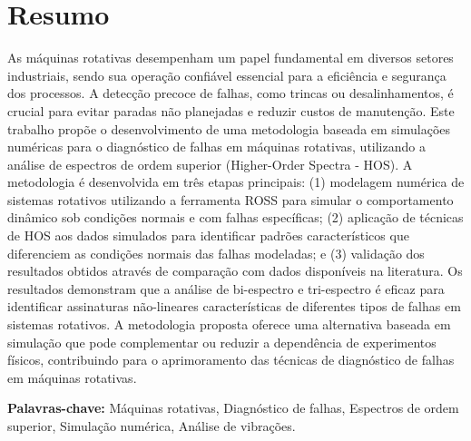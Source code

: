 
\chapter*{Resumo}

As máquinas rotativas desempenham um papel fundamental em diversos setores industriais, sendo sua operação confiável essencial para a eficiência e segurança dos processos. A detecção precoce de falhas, como trincas ou desalinhamentos, é crucial para evitar paradas não planejadas e reduzir custos de manutenção. Este trabalho propõe o desenvolvimento de uma metodologia baseada em simulações numéricas para o diagnóstico de falhas em máquinas rotativas, utilizando a análise de espectros de ordem superior (Higher-Order Spectra - HOS). A metodologia é desenvolvida em três etapas principais: (1) modelagem numérica de sistemas rotativos utilizando a ferramenta ROSS para simular o comportamento dinâmico sob condições normais e com falhas específicas; (2) aplicação de técnicas de HOS aos dados simulados para identificar padrões característicos que diferenciem as condições normais das falhas modeladas; e (3) validação dos resultados obtidos através de comparação com dados disponíveis na literatura. Os resultados demonstram que a análise de bi-espectro e tri-espectro é eficaz para identificar assinaturas não-lineares características de diferentes tipos de falhas em sistemas rotativos. A metodologia proposta oferece uma alternativa baseada em simulação que pode complementar ou reduzir a dependência de experimentos físicos, contribuindo para o aprimoramento das técnicas de diagnóstico de falhas em máquinas rotativas.

\textbf{Palavras-chave:} Máquinas rotativas, Diagnóstico de falhas, Espectros de ordem superior, Simulação numérica, Análise de vibrações.

\cleardoublepage
